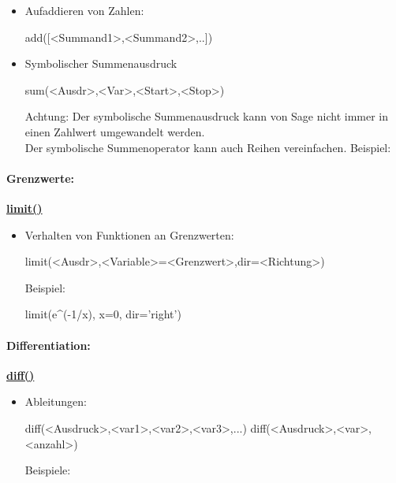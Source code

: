 \documentclass[a4paper,9pt,DIV15,twocolumn]{scrartcl}
\begin{document}
{\begin{itemize}
 \item Aufaddieren von Zahlen:
 \begin{sageinsmall}
add([<Summand1>,<Summand2>,..]) 
\end{sageinsmall}
 \item Symbolischer Summenausdruck
 \begin{sageinsmall}
sum(<Ausdr>,<Var>,<Start>,<Stop>) 
\end{sageinsmall}
Achtung: Der symbolische Summenausdruck kann von Sage nicht immer in einen Zahlwert umgewandelt werden.\\
Der symbolische Summenoperator kann auch Reihen vereinfachen. Beispiel:
\end{itemize}

\paragraph{Grenzwerte:} \href{https://sage.math.uni-goettingen.de/doc/static/reference/calculus/sage/calculus/calculus.html#sage.calculus.calculus.limit}{\textbf{limit()}}
\begin{itemize}
 \item Verhalten von Funktionen an Grenzwerten:
 \begin{sageinsmall}
limit(<Ausdr>,<Variable>=<Grenzwert>,dir=<Richtung>)
\end{sageinsmall}
Beispiel:
 \begin{sageinsmall}
limit(e^(-1/x), x=0, dir='right')
 \end{sageinsmall}
 \end{itemize}
 
\paragraph{Differentiation:} \href{https://sage.math.uni-goettingen.de/doc/static/reference/sage/calculus/functional.html?highlight=diff#sage.calculus.functional.diff}{\textbf{diff()}}
\begin{itemize}
 \item Ableitungen: 
\begin{sageinsmall}
diff(<Ausdruck>,<var1>,<var2>,<var3>,...)
diff(<Ausdruck>,<var>,<anzahl>) 
\end{sageinsmall}
Beispiele:
\end{itemize}

}
\end{document}
